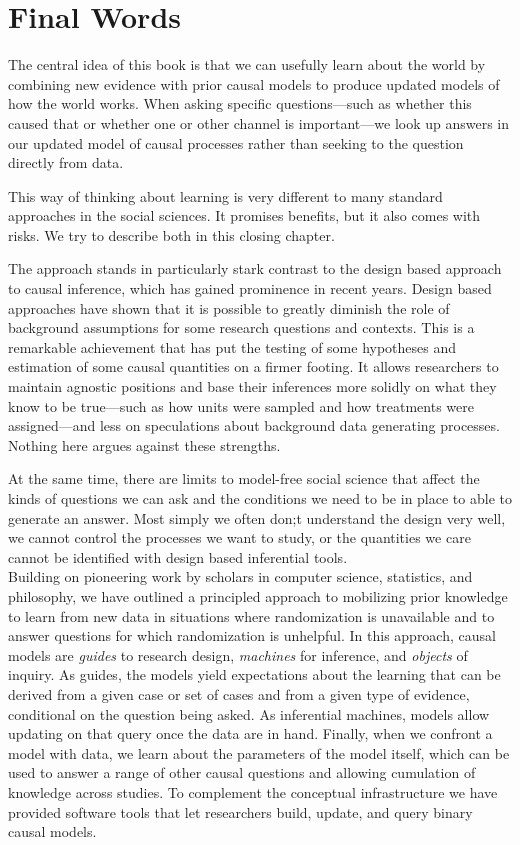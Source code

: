 \documentclass[
  12pt,
]{book}
\begin{document}
\hypertarget{conclusionchapter}{%
\chapter{Final Words}\label{conclusionchapter}}

The central idea of this book is that we can usefully learn about the world by combining new evidence with prior causal models to produce updated models of how the world works. When asking specific questions---such as whether this caused that or whether one or other channel is important---we look up answers in our updated model of causal processes rather than seeking to the question directly from data.

This way of thinking about learning is very different to many standard approaches in the social sciences. It promises benefits, but it also comes with risks. We try to describe both in this closing chapter.

The approach stands in particularly stark contrast to the design based approach to causal inference, which has gained prominence in recent years. Design based approaches have shown that it is possible to greatly diminish the role of background assumptions for some research questions and contexts. This is a remarkable achievement that has put the testing of some hypotheses and estimation of some causal quantities on a firmer footing. It allows researchers to maintain agnostic positions and base their inferences more solidly on what they know to be true---such as how units were sampled and how treatments were assigned---and less on speculations about background data generating processes. Nothing here argues against these strengths.

At the same time, there are limits to model-free social science that affect the kinds of questions we can ask and the conditions we need to be in place to able to generate an answer. Most simply we often don;t understand the design very well, we cannot control the processes we want to study, or the quantities we care cannot be identified with design based inferential tools.\\

Building on pioneering work by scholars in computer science, statistics, and philosophy, we have outlined a principled approach to mobilizing prior knowledge to learn from new data in situations where randomization is unavailable and to answer questions for which randomization is unhelpful. In this approach, causal models are \emph{guides} to research design, \emph{machines} for inference, and \emph{objects} of inquiry. As guides, the models yield expectations about the learning that can be derived from a given case or set of cases and from a given type of evidence, conditional on the question being asked. As inferential machines, models allow updating on that query once the data are in hand. Finally, when we confront a model with data, we learn about the parameters of the model itself, which can be used to answer a range of other causal questions and allowing cumulation of knowledge across studies. To complement the conceptual infrastructure we have provided software tools that let researchers build, update, and query binary causal models.
\end{document}
